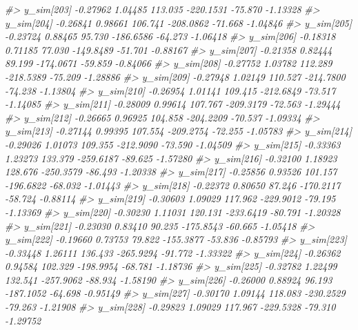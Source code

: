 \documentclass[
  10pt,
  italian,
  a4paper,
  extrafontsizes,onecolumn,openright
  ]{memoir}
\newenvironment{Shaded}{\begin{snugshade}}{\end{snugshade}}
\newcommand{\CommentTok}[1]{\textcolor[rgb]{0.56,0.35,0.01}{\textit{#1}}}
\begin{document}
\begin{Shaded}
\begin{Highlighting}[]
\CommentTok{\#\textgreater{} y\_sim[203] {-}0.27962 1.04485 113.035 {-}220.1531 {-}75.870 {-}1.13328}
\CommentTok{\#\textgreater{} y\_sim[204] {-}0.26841 0.98661 106.741 {-}208.0862 {-}71.668 {-}1.04846}
\CommentTok{\#\textgreater{} y\_sim[205] {-}0.23724 0.88465  95.730 {-}186.6586 {-}64.273 {-}1.06418}
\CommentTok{\#\textgreater{} y\_sim[206] {-}0.18318 0.71185  77.030 {-}149.8489 {-}51.701 {-}0.88167}
\CommentTok{\#\textgreater{} y\_sim[207] {-}0.21358 0.82444  89.199 {-}174.0671 {-}59.859 {-}0.84066}
\CommentTok{\#\textgreater{} y\_sim[208] {-}0.27752 1.03782 112.289 {-}218.5389 {-}75.209 {-}1.28886}
\CommentTok{\#\textgreater{} y\_sim[209] {-}0.27948 1.02149 110.527 {-}214.7800 {-}74.238 {-}1.13804}
\CommentTok{\#\textgreater{} y\_sim[210] {-}0.26954 1.01141 109.415 {-}212.6849 {-}73.517 {-}1.14085}
\CommentTok{\#\textgreater{} y\_sim[211] {-}0.28009 0.99614 107.767 {-}209.3179 {-}72.563 {-}1.29444}
\CommentTok{\#\textgreater{} y\_sim[212] {-}0.26665 0.96925 104.858 {-}204.2209 {-}70.537 {-}1.09334}
\CommentTok{\#\textgreater{} y\_sim[213] {-}0.27144 0.99395 107.554 {-}209.2754 {-}72.255 {-}1.05783}
\CommentTok{\#\textgreater{} y\_sim[214] {-}0.29026 1.01073 109.355 {-}212.9090 {-}73.590 {-}1.04509}
\CommentTok{\#\textgreater{} y\_sim[215] {-}0.33363 1.23273 133.379 {-}259.6187 {-}89.625 {-}1.57280}
\CommentTok{\#\textgreater{} y\_sim[216] {-}0.32100 1.18923 128.676 {-}250.3579 {-}86.493 {-}1.20338}
\CommentTok{\#\textgreater{} y\_sim[217] {-}0.25856 0.93526 101.157 {-}196.6822 {-}68.032 {-}1.01443}
\CommentTok{\#\textgreater{} y\_sim[218] {-}0.22372 0.80650  87.246 {-}170.2117 {-}58.724 {-}0.88114}
\CommentTok{\#\textgreater{} y\_sim[219] {-}0.30603 1.09029 117.962 {-}229.9012 {-}79.195 {-}1.13369}
\CommentTok{\#\textgreater{} y\_sim[220] {-}0.30230 1.11031 120.131 {-}233.6419 {-}80.791 {-}1.20328}
\CommentTok{\#\textgreater{} y\_sim[221] {-}0.23030 0.83410  90.235 {-}175.8543 {-}60.665 {-}1.05418}
\CommentTok{\#\textgreater{} y\_sim[222] {-}0.19660 0.73753  79.822 {-}155.3877 {-}53.836 {-}0.85793}
\CommentTok{\#\textgreater{} y\_sim[223] {-}0.33448 1.26111 136.433 {-}265.9294 {-}91.772 {-}1.33322}
\CommentTok{\#\textgreater{} y\_sim[224] {-}0.26362 0.94584 102.329 {-}198.9954 {-}68.781 {-}1.18736}
\CommentTok{\#\textgreater{} y\_sim[225] {-}0.32782 1.22499 132.541 {-}257.9062 {-}88.934 {-}1.58190}
\CommentTok{\#\textgreater{} y\_sim[226] {-}0.26000 0.88924  96.193 {-}187.1052 {-}64.698 {-}0.95149}
\CommentTok{\#\textgreater{} y\_sim[227] {-}0.30170 1.09144 118.083 {-}230.2529 {-}79.263 {-}1.21908}
\CommentTok{\#\textgreater{} y\_sim[228] {-}0.29823 1.09029 117.967 {-}229.5328 {-}79.310 {-}1.29752}

\end{Highlighting}
\end{Shaded}
\end{document}
